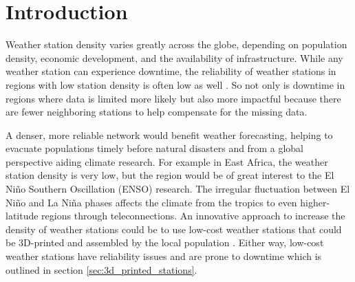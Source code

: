\section{Introduction}
\label{sec:introduction}


Weather station density varies greatly across the globe, depending on population density, economic development, and the availability of infrastructure. \cite{ortizbobea2021} While any weather station can experience downtime, the reliability of weather stations in regions with low station density is often low as well \cite{Mistry2022GlobalWeatherStations}. So not only is downtime in regions where data is limited more likely but also more impactful because there are fewer neighboring stations to help compensate for the missing data.


A denser, more reliable network would benefit weather forecasting, helping to evacuate populations timely before natural disasters \cite{muita2021} and from a global perspective aiding climate research. For example in East Africa, the weather station density is very low, but the region would be of great interest to the El Niño Southern Oscillation (ENSO) research. The irregular fluctuation between El Niño and La Niña phases affects the climate from the tropics to even higher-latitude regions through teleconnections. \cite{marchant2007, muita2021}  An innovative approach to increase the density of weather stations could be to use low-cost weather stations that could be 3D-printed and assembled by the local population \cite{muita2021}. Either way, low-cost weather stations have reliability issues and are prone to downtime which is outlined in section \ref{sec:3d_printed_stations}.



